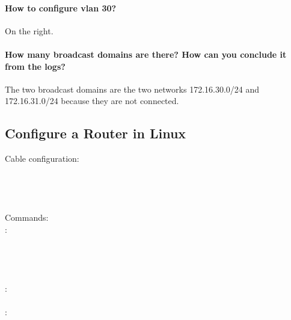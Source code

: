 \documentclass[compilation.tex]{subfiles}
\begin{document}
\paragraph{How to configure vlan 30?}
On the right.

\paragraph{How many broadcast domains are there? How can you conclude it from the logs?}
The two broadcast domains are the two networks 172.16.30.0/24 and 172.16.31.0/24 because they are not connected.


\subsection{Configure a Router in Linux}
\label{exp:3}

\begin{cables}{8}{0.5}
	\vspace*{-1.5\baselineskip}
	Cable configuration:\\
	\\
	\\
	\\
	\\
	
	Commands:\\
	:\\
	\\
	\\
	\\
	\\
	:\\
	\\
	:\\
	\\
	\\
	\\
	\\
\end{cables}
\end{document}

